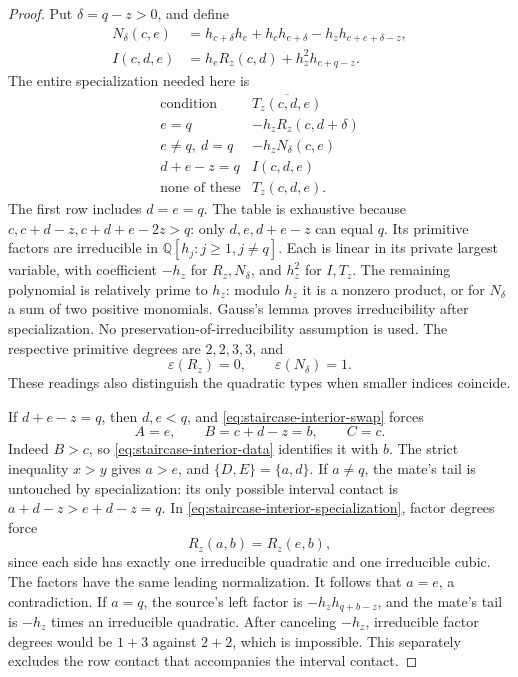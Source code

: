 \documentclass[11pt,a4paper]{amsart}
\numberwithin{equation}{section}
\theoremstyle{plain}
\theoremstyle{definition}
\newcommand{\Q}{\mathbb Q}
\begin{document}
\begin{proof}
Put \(\delta=q-z>0\), and define
\begin{align*}
 N_\delta(c,e)&=h_{c+\delta}h_e+h_ch_{e+\delta}
                         -h_zh_{c+e+\delta-z},\\
 I(c,d,e)&=h_eR_z(c,d)+h_z^2h_{c+q-z}.
\end{align*}
The entire specialization needed here is
\begin{equation}\label{eq:staircase-interior-factor-table}
\begin{array}{c|c}
 \text{condition}&\overline{T_z(c,d,e)}\\\hline
 e=q&-h_zR_z(c,d+\delta)\\
 e\ne q,\ d=q&-h_zN_\delta(c,e)\\
 d+e-z=q&I(c,d,e)\\
 \text{none of these}&T_z(c,d,e).
\end{array}
\end{equation}
The first row includes \(d=e=q\).  The table is exhaustive because
\(c,c+d-z,c+d+e-2z>q\): only \(d,e,d+e-z\) can equal \(q\).
Its primitive factors are irreducible in \(\Q[h_j:j\ge1,j\ne q]\).
Each is linear in its private largest variable, with coefficient
\(-h_z\) for \(R_z,N_\delta\), and \(h_z^2\) for \(I,T_z\).
The remaining polynomial is relatively prime to \(h_z\): modulo
\(h_z\) it is a nonzero product, or for \(N_\delta\) a sum of
two positive monomials.  Gauss's lemma proves irreducibility after
specialization.  No preservation-of-irreducibility assumption is used.
The respective primitive degrees are \(2,2,3,3\), and
\[
 \varepsilon(R_z)=0,\qquad \varepsilon(N_\delta)=1.
\]
These readings also distinguish the quadratic types when smaller
indices coincide.

If \(d+e-z=q\), then \(d,e<q\), and
\eqref{eq:staircase-interior-swap} forces
\[
 A=e,\qquad B=c+d-z=b,\qquad C=c.
\]
Indeed \(B>c\), so \eqref{eq:staircase-interior-data} identifies
it with \(b\).  The strict inequality \(x>y\) gives \(a>e\),
and \(\{D,E\}=\{a,d\}\).
If \(a\ne q\), the mate's tail is untouched by specialization:
its only possible interval contact is
\(a+d-z>e+d-z=q\).  In
\eqref{eq:staircase-interior-specialization}, factor degrees force
\[
 R_z(a,b)=R_z(e,b),
\]
since each side has exactly one irreducible quadratic and one
irreducible cubic.  The factors have the same leading normalization.
It follows that \(a=e\), a contradiction.
If \(a=q\), the source's left factor is \(-h_zh_{q+b-z}\),
and the mate's tail is \(-h_z\) times an irreducible quadratic.
After canceling \(-h_z\), irreducible factor degrees would be
\(1+3\) against \(2+2\), which is impossible.  This separately
excludes the row contact that accompanies the interval contact.


\end{proof}
\end{document}
